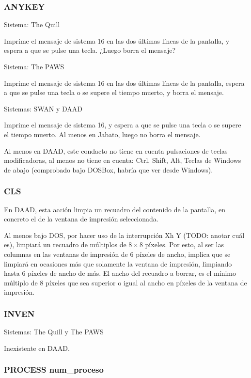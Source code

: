 \documentclass[11pt, a5paper]{article}
\newcommand{\quill}{\textsf{The Quill}\xspace}
\newcommand{\paw}{\textsf{The PAWS}\xspace}
\newcommand{\swan}{\textsf{SWAN}\xspace}
\newcommand{\daad}{\textsf{DAAD}\xspace}
\newcommand{\sistema}[1]{\noindent Sistema: #1 \nopagebreak}
\newcommand{\sistemas}[1]{\noindent Sistemas: #1 \nopagebreak}
\begin{document}
\subsubsection{ANYKEY}

\sistema{\quill}

Imprime el mensaje de sistema 16 en las dos últimas líneas de la pantalla, y espera a que se pulse una tecla. ¿Luego borra el mensaje?

\sistema{\paw}

Imprime el mensaje de sistema 16 en las dos últimas líneas de la pantalla, espera a que se pulse una tecla o se supere el tiempo muerto, y borra el mensaje.

\sistemas{\swan y \daad}

Imprime el mensaje de sistema 16, y espera a que se pulse una tecla o se supere el tiempo muerto. Al menos en Jabato, luego no borra el mensaje.

Al menos en \daad, este condacto no tiene en cuenta pulsaciones de teclas modificadoras, al menos no tiene en cuenta: Ctrl, Shift, Alt, Teclas de Windows de abajo (comprobado bajo DOSBox, habría que ver desde Windows).

\subsubsection{CLS}

En \daad, esta acción limpia un recuadro del contenido de la pantalla, en concreto el de la ventana de impresión seleccionada.

Al menos bajo DOS, por hacer uso de la interrupción Xh Y (TODO: anotar cuál es), limpiará un recuadro de múltiplos de $8 \times 8$ píxeles. Por esto, al ser las columnas en las ventanas de impresión de 6 píxeles de ancho, implica que se limpiará en ocasiones más que solamente la ventana de impresión, limpiando hasta 6 píxeles de ancho de más. El ancho del recuadro a borrar, es el mínimo múltiplo de 8 píxeles que sea superior o igual al ancho en píxeles de la ventana de impresión.

\subsubsection{INVEN}

\sistemas{\quill y \paw}

Inexistente en \daad.

\subsubsection{PROCESS num\_proceso}
\end{document}
